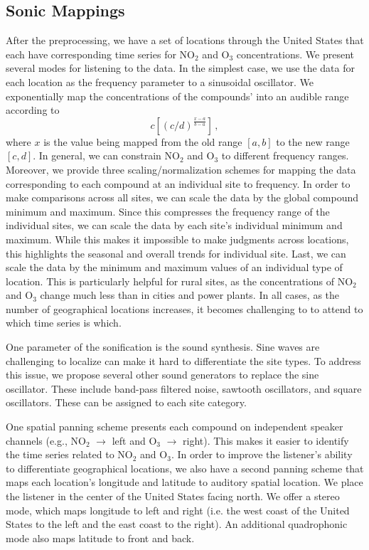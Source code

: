 \documentclass[a4paper,10pt,oneside]{article}
\newcommand{\ce}[1]{$\mathrm{#1}$}
\begin{document}
\begin{sloppy}
\subsection{Sonic Mappings}
\label{sec:sonic-mappings}
After the preprocessing, we have a set of locations through the United States that each have corresponding time series for \ce{NO_2} and \ce{O_3} concentrations. We present several modes for listening to the data. In the simplest case, we use the data for each location as the frequency parameter to a sinusoidal oscillator.  We exponentially map the concentrations of the compounds' into an audible range according to
\begin{equation}
    c \left[(c/d)^{\frac{x-a}{b-a}}\right]\,,
\end{equation}
where $x$ is the value being mapped from the old range $[a, b]$ to the new range $[c, d]$.  In general, we can constrain \ce{NO_2} and \ce{O_3} to different frequency ranges.  Moreover, we provide three scaling/normalization schemes for mapping the data corresponding to each compound at an individual site to frequency. In order to make comparisons across all sites, we can scale the data by the global compound minimum and maximum.  Since this compresses the frequency range of the individual sites, we can scale the data by each site's individual minimum and maximum. While this makes it impossible to make judgments across locations, this highlights the seasonal and overall trends for individual site. Last, we can scale the data by the minimum and maximum values of an individual type of location. This is particularly helpful for rural sites, as the concentrations of \ce{NO_2} and \ce{O_3} change much less than in cities and power plants. In all cases, as the number of geographical locations increases, it becomes challenging to to attend to which time series is which.  


One parameter of the sonification is the sound synthesis. Sine waves are challenging to localize can make it hard to differentiate the site types. To address this issue, we propose several other sound generators to replace the sine oscillator. These include band-pass filtered noise, sawtooth oscillators, and square oscillators. These can be assigned to each site category.  

One spatial panning scheme presents each compound on independent speaker channels (e.g., \ce{NO_2} $\rightarrow$ left and \ce{O_3} $\rightarrow$ right).  This  makes it easier to identify the time series related to \ce{NO_2} and \ce{O_3}.  In order to improve the listener's ability to differentiate geographical locations, we also have a second panning scheme that maps each location's longitude and latitude to auditory spatial location. We place the listener in the center of the United States facing north.  We offer a stereo mode, which maps longitude to left and right (i.e. the west coast of the United States to the left and the east coast to the right). An additional quadrophonic mode also maps latitude to front and back. 



\end{sloppy}
\end{document}
